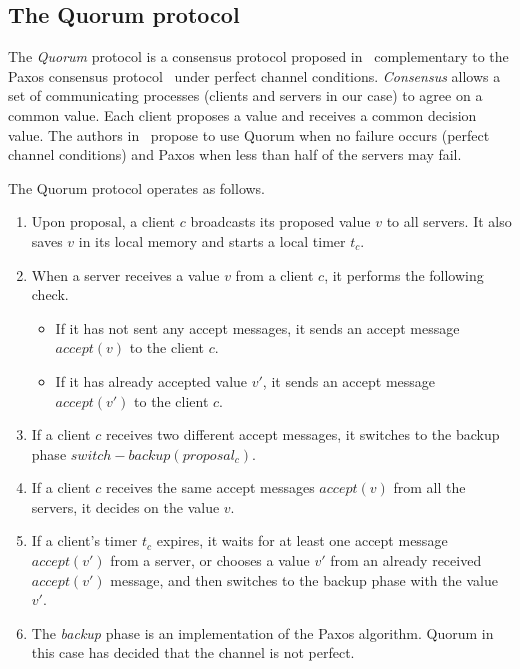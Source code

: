 \subsection{The Quorum protocol}
\label{subsec:quorum}
%
The \emph{Quorum} protocol is a consensus protocol proposed in~\cite{guerraoui2012speculative}
complementary to the Paxos consensus protocol~\cite{gafni2003disk} under perfect
channel conditions. {\em Consensus} allows a set of communicating processes
(clients and servers in our case) to agree on a common value. Each client proposes
a value and receives a common decision value. The authors in~\cite{guerraoui2012speculative}
propose to use Quorum when no failure occurs (perfect channel conditions) and 
Paxos when less than half of the servers may fail. 

The Quorum protocol operates as follows.
\begin{enumerate}
 \item Upon proposal, a client $c$ broadcasts its proposed value 
 $v$ to all servers. It also saves $v$ in its local memory and starts a local timer
 $t_c$. 
 \item When a server receives a value $v$ from a client $c$, it performs
 the following check.
 \begin{itemize}
  \item If it has not sent any accept messages, it sends an accept message
  $\mathit{accept}(v)$ to the client $c$. 
  \item If it has already accepted value $v'$, it sends an accept message
  $\mathit{accept}(v')$ to the client $c$. 
 \end{itemize}
 \item If a client $c$ receives two different accept messages, it switches
 to the backup phase $\mathit{switch-backup}(\mathit{proposal_c})$.
 \item If a client $c$ receives the same accept messages $\mathit{accept}(v)$ from all the servers,
 it decides on the value $v$.
 \item If a client's timer $t_c$ expires, it waits for at least
 one accept message $\mathit{accept}(v')$ from a server, or chooses a value $v'$
 from an already received $\mathit{accept}(v')$ message, and then switches to 
 the backup phase with the value $v'$. 
 \item
 The {\em backup} phase is an implementation of the Paxos algorithm. Quorum in this case has decided that the channel is not perfect. 
\end{enumerate}
